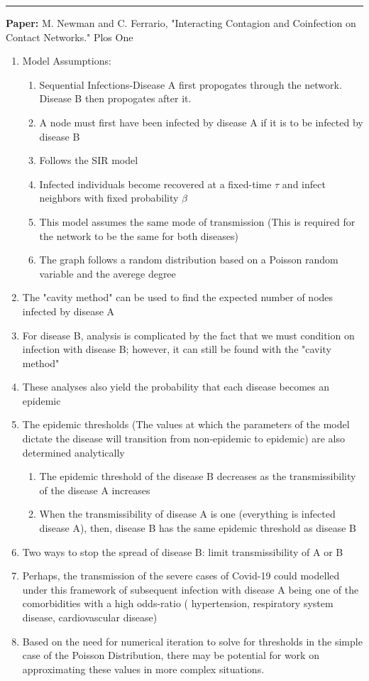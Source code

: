 \documentclass[11pt]{article}
\begin{document}
\smallskip
\noindent
\rule{\textwidth}{0.01in}
\textbf{Paper:} M. Newman and C. Ferrario, "Interacting Contagion and Coinfection on Contact Networks." Plos One
\begin{enumerate}
    \item Model Assumptions:
    \begin{enumerate}
        \item Sequential Infections-Disease A first propogates through the network. Disease B then propogates after it.
        \item A node must first have been infected by disease A if it is to be infected by disease B
        \item Follows the SIR model
        \item Infected individuals become recovered at a fixed-time $\tau$ and infect neighbors with fixed probability $\beta$
        \item This model assumes the same mode of transmission (This is required for the network to be the same for both diseases)
        \item The graph follows a random distribution based on a Poisson random variable and the averege degree
    \end{enumerate}
    \item The "cavity method" can be used to find the expected number of nodes infected by disease A
    \item For disease B, analysis is complicated by the fact that we must condition on infection with disease B; however, it can still be found with the "cavity method"
    \item These analyses also yield the probability that each disease becomes an epidemic
    \item The epidemic thresholds (The values at which the parameters of the model dictate the disease will transition from non-epidemic to epidemic) are also determined analytically
    \begin{enumerate}
        
        \item The epidemic threshold of the disease B decreases as the transmissibility of the disease A increases
        
        \item When the transmissibility of disease A is one (everything is infected disease A), then, disease B has the same epidemic threshold as disease B
        
    \end{enumerate}
    \item Two ways to stop the spread of disease B: limit transmissibility of A or B
    \item Perhaps, the transmission of the severe cases of Covid-19 could modelled under this framework of subsequent infection with disease A being one of the comorbidities with a high odds-ratio ( hypertension, respiratory system disease, cardiovascular
    disease)
    \item Based on the need for numerical iteration to solve for thresholds in the simple case of the Poisson Distribution, there may be potential for work on approximating these values in more complex situations. 
    
\end{enumerate}
\end{document}
